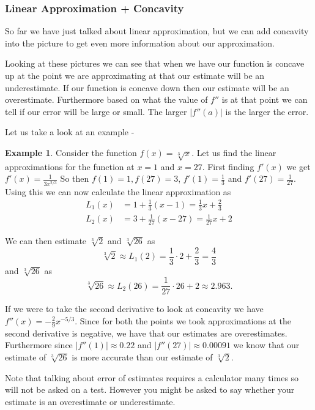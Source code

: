 \documentclass[12pt,reqno]{article}
\theoremstyle{definition}
\newtheorem*{Example}{Example}
\begin{document}
\subsubsection{Linear Approximation + Concavity}

So far we have just talked about linear approximation, but we can add concavity into the picture to get even more information about our approximation. 

Looking at these pictures we can see that when we have our function is concave up at the point we are approximating at that our estimate will be an underestimate. If our function is concave down then our estimate will be an overestimate. Furthermore based on what the value of $f''$ is at that point we can tell if our error will be large or small. The larger $|f''(a)|$ is the larger the error. 

Let us take a look at an example - 
\begin{Example}
	Consider the function $f(x) = \sqrt[3]{x}$. Let us find the linear approximations for the function at $x = 1$ and $x = 27$. First finding $f'(x)$ we get $f'(x) = \frac{1}{3 x^{2/3}}$ So then $f(1) = 1, f(27) = 3$, $f'(1) = \frac{1}{3}$ and $f'(27) = \frac{1}{27}$. Using this we can now calculate the linear approximation as 
	\begin{align*}
		L_1 (x) &= 1 + \frac{1}{3} (x - 1) = \frac{1}{3} x + \frac{2}{3} \\
		L_{2} (x) &= 3 + \frac{1}{27}(x - 27) = \frac{1}{27} x + 2
	\end{align*}
	
	We can then estimate $\sqrt[3]{2}$ and $\sqrt[3]{26}$ as $$\sqrt[3]{2} \approx L_1 (2) = \frac{1}{3}\cdot 2 + \frac{2}{3} = \frac{4}{3}$$ and $\sqrt[3]{26}$ as $$\sqrt[3]{26} \approx L_2 (26) = \frac{1}{27} \cdot 26 + 2 \approx 2.963.$$
	
	If we were to take the second derivative to look at concavity we have $f''(x) = -\frac{2}{9} x^{-5/3}$. Since for both the points we took approximations at the second derivative is negative, we have that our estimates are overestimates. Furthermore since $|f''(1)|\approx 0.22$ and $|f''(27)|\approx 0.00091$ we know that our estimate of $\sqrt[3]{26}$ is more accurate than our estimate of $\sqrt[3]{2}$. 
	
	Note that talking about error of estimates requires a calculator many times so will not be asked on a test. However you might be asked to say whether your estimate is an overestimate or underestimate. 
\end{Example}
\end{document}
